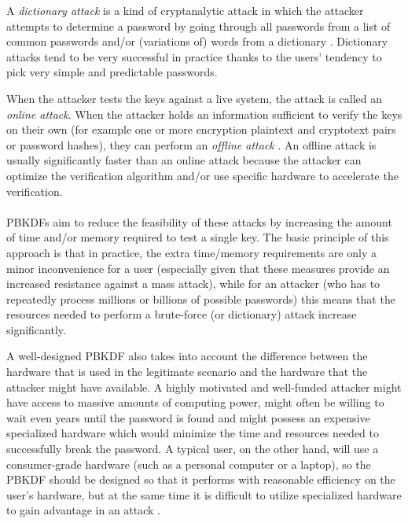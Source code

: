 \documentclass[12pt,oneside]{fithesis2}
\begin{document}
      A \emph{dictionary attack} is a kind of cryptanalytic attack in which the attacker attempts to determine a password by going through all passwords from a list of common passwords and/or (variations of) words from a dictionary \cite{appliedCrypto}. Dictionary attacks tend to be very successful in practice thanks to the users' tendency to pick very simple and predictable passwords.
      
      When the attacker tests the keys against a live system, the attack is called an \emph{online attack}. When the attacker holds an information sufficient to verify the keys on their own (for example one or more encryption plaintext and cryptotext pairs or password hashes), they can perform an \emph{offline attack} \cite{appliedCrypto}. An offline attack is usually significantly faster than an online attack because the attacker can optimize the verification algorithm and/or use specific hardware to accelerate the verification.
      
      \paragraph*{}
      PBKDFs aim to reduce the feasibility of these attacks by increasing the amount of time and/or memory required to test a single key. The basic principle of this approach is that in practice, the extra time/memory requirements are only a minor inconvenience for a user (especially given that these measures provide an increased resistance against a mass attack), while for an attacker (who has to repeatedly process millions or billions of possible passwords) this means that the resources needed to perform a brute-force (or dictionary) attack increase significantly.
      
      A well-designed PBKDF also takes into account the difference between the hardware that is used in the legitimate scenario and the hardware that the attacker might have available. A highly motivated and well-funded attacker might have access to massive amounts of computing power, might often be willing to wait even years until the password is found and might possess an expensive specialized hardware which would minimize the time and resources needed to successfully break the password. A typical user, on the other hand, will use a consumer-grade hardware (such as a personal computer or a laptop), so the PBKDF should be designed so that it performs with reasonable efficiency on the user's hardware, but at the same time it is difficult to utilize specialized hardware to gain advantage in an attack \cite{openwall:pwHashing}.
      
\end{document}
